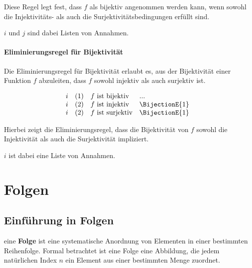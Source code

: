 \documentclass[main.tex]{subfiles}
\begin{document}
Diese Regel legt fest, dass \( f \) als bijektiv angenommen werden kann, wenn sowohl die Injektivitäts- als auch die Surjektivitätsbedingungen erfüllt sind.

\(i\) und \(j\) sind dabei Listen von Annahmen.

\subsubsection*{Eliminierungsregel für Bijektivität}
\label{rule:BijectionE}

Die Eliminierungsregel für Bijektivität erlaubt es, aus der Bijektivität einer Funktion \( f \) abzuleiten, dass \( f \) sowohl injektiv als auch surjektiv ist.

\[
\begin{array}{llll}
    i       & (1) & f \text{ ist bijektiv} & ... \\
    i       & (2) & f \text{ ist injektiv} & \BijectionE{1}\\
    i       & (2) & f \text{ ist surjektiv} & \BijectionE{1}
\end{array}
\]

Hierbei zeigt die Eliminierungsregel, dass die Bijektivität von \( f \) sowohl die Injektivität als auch die Surjektivität impliziert.

\(i\) ist dabei eine Liste von Annahmen.



\chapter{Folgen}

\section{Einführung in Folgen}
eine \textbf{Folge} ist eine systematische Anordnung von Elementen in einer bestimmten Reihenfolge. Formal betrachtet ist eine Folge eine Abbildung, die jedem natürlichen Index \(n\) ein Element aus einer bestimmten Menge zuordnet.
\end{document}
